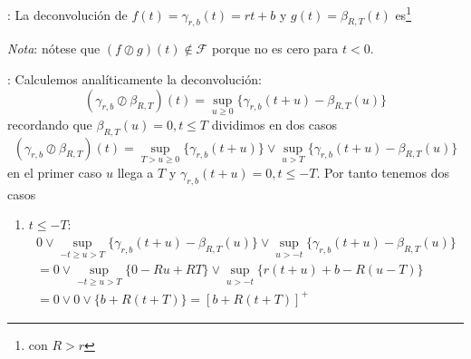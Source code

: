 \documentclass[xcolor={x11names}]{beamer}
\begin{document}
\begin{frame}{\secname: \subsecname}
    La deconvolución de
    $f(t)=\gamma_{r,b}(t)
    =rt+b$
    y $g(t)=\beta_{R,T}(t)$
    es\footnote{con $R>r$}
    \vfill
    \begin{figure}[h]
        \centering
        
    \end{figure}


    \vfill

    \emph{Nota}: nótese
    que $(f\oslash g)(t)
    \notin \mathcal{F}$
    porque no es cero para
    $t<0$.
\end{frame}



\begin{frame}{\secname: \subsecname}
    Calculemos analíticamente
    la deconvolución:
    \begin{equation*}
        (\gamma_{r,b}
        \oslash
        \beta_{R,T})(t)
        =\sup_{u \geq0}
        \{
        \gamma_{r,b}(t+u)
        - \beta_{R,T}(u)
        \}
    \end{equation*}
    recordando que
    $\beta_{R,T}(u)=0,
    t\leq T$ dividimos en dos
    casos
    \pause
    \begin{equation*}
        (\gamma_{r,b}
        \oslash
        \beta_{R,T})(t)
        =\sup_{T>u \geq0}
        \{
        \gamma_{r,b}(t+u)
        \}
        \lor
        \sup_{u>T}
        \{
        \gamma_{r,b}(t+u)
        -
        \beta_{R,T}(u)
        \}
    \end{equation*}
    \pause
    en el primer caso
    $u$ llega a $T$
    y
    $\gamma_{r,b}(t+u)=0,
    t\leq-T$.
    Por tanto tenemos dos casos
    \begin{enumerate}
        \item $t\leq-T$:
    \begin{multline*}
        0
        \lor
        \sup_{-t\geq u>T}
        \{
        \gamma_{r,b}(t+u)
        -
        \beta_{R,T}(u)
        \}
        \lor
        \sup_{u>-t}
        \{
        \gamma_{r,b}(t+u)
        -
        \beta_{R,T}(u)
        \}\\
        = 0
        \lor
        \sup_{-t\geq u>T}
        \{0-Ru+RT\}
        \lor
        \sup_{u>-t}\{ r(t+u)+b
        -R(u-T)\}\\
        =0\lor0\lor
        \{b+R(t+T)\}
        =[b+R(t+T)]^+
    \end{multline*}
    \end{enumerate}

\end{frame}
\end{document}
